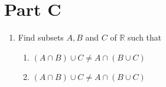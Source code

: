 \documentclass[11pt,a4paper]{article}
\newcommand{\R}{\mathbb{R}}
\begin{document}
\section*{Part C}
    \begin{enumerate}
        \item Find subsets $A,B$ and $C$ of $\R$ such that
        \begin{enumerate}
            \item $(A \cap B) \cup C \neq A \cap (B \cup C)$
            \item $(A \cap B) \cup C \neq A \cap (B \cup C)$
        \end{enumerate}
    \end{enumerate}
\end{document}
